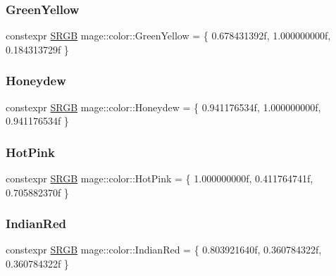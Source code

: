 \hypertarget{namespacemage_1_1color_a59100450f627741d9b87d68870c000bc}{}\label{namespacemage_1_1color_a59100450f627741d9b87d68870c000bc} 
\subsubsection{\texorpdfstring{Green\+Yellow}{GreenYellow}}
{\footnotesize\ttfamily constexpr \hyperlink{structmage_1_1_s_r_g_b}{S\+R\+GB} mage\+::color\+::\+Green\+Yellow = \{ 0.\+678431392f, 1.\+000000000f, 0.\+184313729f \}}

\hypertarget{namespacemage_1_1color_ac2cf218282d11f2f3aaee6fa78af6038}{}\label{namespacemage_1_1color_ac2cf218282d11f2f3aaee6fa78af6038} 
\subsubsection{\texorpdfstring{Honeydew}{Honeydew}}
{\footnotesize\ttfamily constexpr \hyperlink{structmage_1_1_s_r_g_b}{S\+R\+GB} mage\+::color\+::\+Honeydew = \{ 0.\+941176534f, 1.\+000000000f, 0.\+941176534f \}}

\hypertarget{namespacemage_1_1color_aff420f4fdc84fc819656c7b942d4a976}{}\label{namespacemage_1_1color_aff420f4fdc84fc819656c7b942d4a976} 
\subsubsection{\texorpdfstring{Hot\+Pink}{HotPink}}
{\footnotesize\ttfamily constexpr \hyperlink{structmage_1_1_s_r_g_b}{S\+R\+GB} mage\+::color\+::\+Hot\+Pink = \{ 1.\+000000000f, 0.\+411764741f, 0.\+705882370f \}}

\hypertarget{namespacemage_1_1color_a45104ede72483cb45b94b9a39f3b47cd}{}\label{namespacemage_1_1color_a45104ede72483cb45b94b9a39f3b47cd} 
\subsubsection{\texorpdfstring{Indian\+Red}{IndianRed}}
{\footnotesize\ttfamily constexpr \hyperlink{structmage_1_1_s_r_g_b}{S\+R\+GB} mage\+::color\+::\+Indian\+Red = \{ 0.\+803921640f, 0.\+360784322f, 0.\+360784322f \}}

